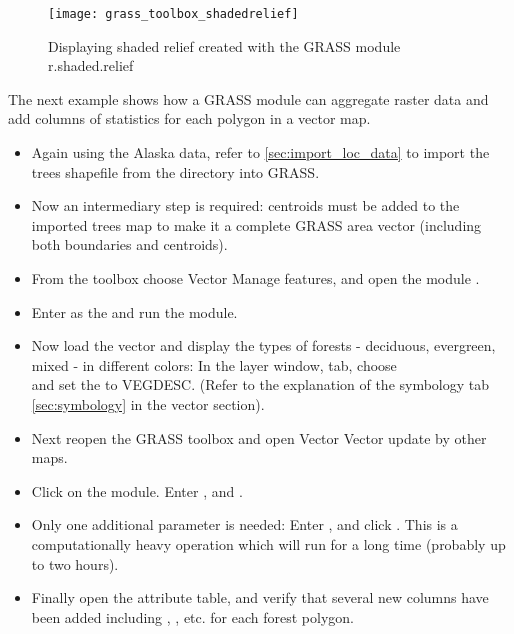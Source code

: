 \begin{figure}[ht]
 \centering
 \texttt{[image: grass\_toolbox\_shadedrelief]}
 \caption{Displaying shaded relief created with the GRASS module
r.shaded.relief \nixcaption}\label{fig:grass_toolbox_shadedrelief}
\end{figure}


The next example shows how a GRASS module can aggregate raster data and add
columns of statistics for each polygon in a vector map.

\begin{itemize}[label=--]
\item Again using the Alaska data, refer to \ref{sec:import_loc_data} to
import the trees shapefile from the  directory
into GRASS.
\item Now an intermediary step is required: centroids must be added to the
imported trees map to make it a complete GRASS area vector (including both
boundaries and centroids).
\item From the toolbox choose Vector \arrow Manage features, and open the
module .
\item Enter as the 
and run the module.
\item Now load the  vector and display the types of
forests - deciduous, evergreen, mixed - in different colors: In the layer
 window,  tab, choose \\
 and set the
 to VEGDESC. (Refer to the
explanation of the symbology tab \ref{sec:symbology} in the vector section).
\item Next reopen the GRASS toolbox and open Vector \arrow Vector update by other
maps.
\item Click on the  module. Enter ,
and .
\item Only one additional parameter is needed: Enter , and click . This is a computationally
heavy operation which will run for a long time (probably up to two hours).
\item Finally open the  attribute table, and verify
that several new columns have been added including ,
,  etc. for each forest polygon.
\end{itemize}

